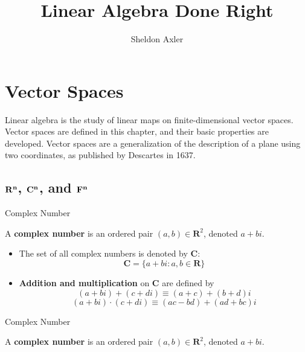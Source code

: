\documentclass[11pt]{article} %
\title{\LARGE {Linear Algebra Done Right}}
\author{Sheldon Axler}
\begin{document}
\maketitle

\section{Vector Spaces}

Linear algebra is the study of linear maps on finite-dimensional vector spaces. Vector spaces are defined in this chapter, and their basic properties are developed. Vector spaces are a generalization of the description of a plane using two coordinates, as published by Descartes in 1637. 

\subsection{$\mathbf{R^n}$, $\mathbf{C^n}$, and $\mathbf{F^n}$}

\begin{deff}{Complex Number}

A \textbf{complex number} is an ordered pair $(a,b) \in \mathbf{R}^2$, denoted $a + bi$.
\begin{itemize}
\item The set of all complex numbers is denoted by $\mathbf{C}$:
  $$
    \mathbf{C} = \{a+bi : a,b \in \mathbf{R}\}
  $$
 \item \textbf{Addition and multiplication} on $\mathbf{C}$ are defined by
  $$
  (a + bi) + (c + di) \equiv (a + c) + (b + d)i 
  $$
  $$
  (a + bi)\cdot(c+di) \equiv (ac - bd) + (ad + bc)i
  $$
\end{itemize}
\end{deff}

\begin{thmm}{Complex Number}

A \textbf{complex number} is an ordered pair $(a,b) \in \mathbf{R}^2$, denoted $a + bi$.
\end{thmm}
\end{document}

